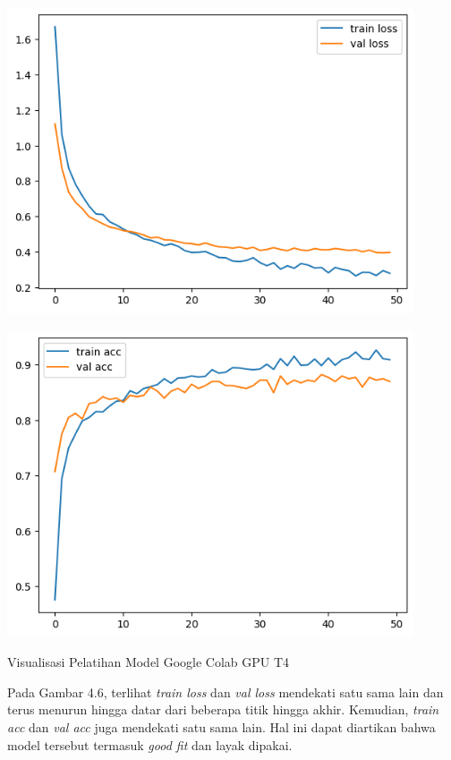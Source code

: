\begin{afigure}
    \includegraphics[height=0.4\textheight, width=0.9\textwidth, center]{images/train-loss.png}
    \label{fig:train-loss}
\end{afigure}
\pagebreak
\begin{afigure}
    \includegraphics[height=0.4\textheight, width=0.9\textwidth, center]{images/train-acc.png}
    \caption{Visualisasi Pelatihan Model Google Colab GPU T4}
    \label{fig:train-acc}
\end{afigure}

Pada Gambar 4.6, terlihat \textit{train loss} dan \textit{val loss} mendekati satu sama lain dan terus menurun hingga datar dari beberapa titik hingga akhir. Kemudian, \textit{train acc} dan \textit{val acc} juga mendekati satu sama lain. Hal ini dapat diartikan bahwa model tersebut termasuk \textit{good fit} dan layak dipakai.

